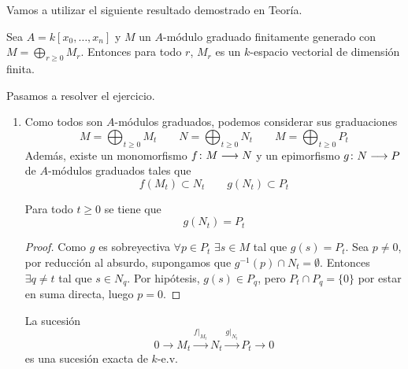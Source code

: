 \documentclass[twoside]{article}
\begin{document}
\begin{solucion}Vamos a utilizar el siguiente resultado demostrado en Teoría.
\begin{lemma}\label{lemma:1}
Sea $A = k[x_0,\dots,x_n]$ y $M$ un $A$-módulo graduado finitamente generado con $M = \bigoplus_{r≥0} M_r$. Entonces para todo $r$, $M_r$ es un $k$-espacio vectorial de dimensión finita.
\end{lemma}
Pasamos a resolver el ejercicio.
\begin{enumerate}
\item  Como todos son $A$-módulos graduados, podemos considerar sus graduaciones
$$
M=\bigoplus_{t\geq 0} M_t \qquad N=\bigoplus_{t\geq 0} N_t \qquad M=\bigoplus_{t\geq 0} P_t $$
Además, existe un monomorfismo $f\colon{M}\longrightarrow{N}$ y un epimorfismo $g\colon{N}\longrightarrow{P}$ de $A$-módulos graduados tales que
\begin{equation}\label{eq:1}
f(M_t) \subset N_t \qquad g(N_t) \subset P_t
\end{equation}
\begin{lemma}\label{lemma:2}
Para todo $t\geq 0$ se tiene que 
$$g(N_t)=P_t$$
\end{lemma}
\begin{proof}
Como $g$ es sobreyectiva $\forall p\in P_t$ $\exists s\in M$ tal que $g(s)=P_t$. Sea $p\neq 0$, por reducción al absurdo, supongamos que $g^{-1}(p)\cap N_t = \emptyset$. Entonces $\exists q\neq t$ tal que $s\in N_q$. Por hipótesis, $g(s)\in P_q$, pero $P_t\cap P_q = \{0\}$ por estar en suma directa, luego $p=0$.
\end{proof}
\begin{lemma}\label{lemma:3} La sucesión
$$0\to M_t\overset{f|_{M_t}}{\to} N_t\overset{g|_{N_t}}{\to} P_t \to 0$$
es una sucesión exacta de $k$-e.v. 
\end{lemma}


\end{enumerate}
\end{solucion}
\end{document}
